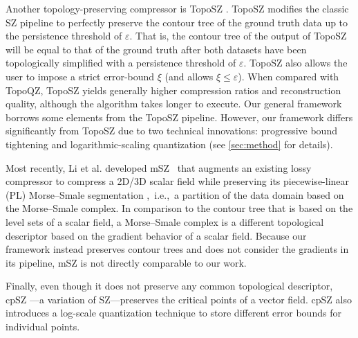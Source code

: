 Another topology-preserving compressor is TopoSZ \cite{yan2023toposz}. 
TopoSZ modifies the classic SZ pipeline to perfectly preserve the contour tree of the ground truth data up to the persistence threshold of $\varepsilon$. 
That is, the contour tree of the output of TopoSZ will be equal to that of the ground truth after both datasets have been topologically simplified with a persistence threshold of $\varepsilon$. 
TopoSZ also allows the user to impose a strict error-bound $\xi$ (and allows $\xi \leq \varepsilon$). When compared with TopoQZ, TopoSZ yields generally higher compression ratios and reconstruction quality, although the algorithm takes longer to execute. 
Our general framework borrows some elements from the TopoSZ pipeline. However, our framework differs significantly from TopoSZ due to two technical innovations: progressive bound tightening and logarithmic-scaling quantization (see \cref{sec:method} for details).  

Most recently, Li et al. developed mSZ~\cite{li2024msz} that augments an existing lossy compressor to compress a 2D/3D scalar field while preserving its piecewise-linear (PL) Morse--Smale segmentation \cite{edelsbrunner2001hierarchical,edelsbrunner2003morse},~i.e.,~a partition of the data domain based on the Morse--Smale complex. 
In comparison to the contour tree that is based on the level sets of a scalar field, a Morse--Smale complex is a different topological descriptor based on the gradient behavior of a scalar field.   
Because our framework instead preserves contour trees and does not consider the gradients in its pipeline, mSZ is not directly comparable to our work. 

Finally, even though it does not preserve any common topological descriptor, cpSZ \cite{liang2022toward}---a variation of SZ---preserves the critical points of a vector field. cpSZ also introduces a log-scale quantization technique to store different error bounds for individual points.
